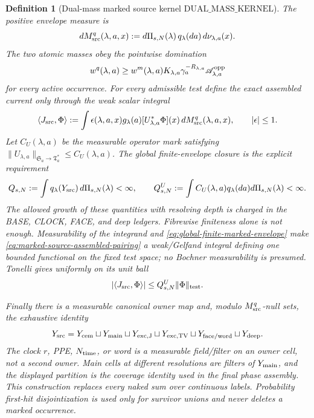 \documentclass[11pt]{article}
\newtheorem{definition}[theorem]{Definition}
\begin{document}
\begin{definition}[Dual-mass marked source kernel
$\mathrm{DUAL\_MASS\_KERNEL}$]
The positive envelope measure is
\begin{equation}
\label{eq:source-incidence-space}
 dM_{\rm src}^{q}(\lambda,a,x):=
 d\Pi_{s,N}(\lambda)\,q_\lambda(da)\,d\nu_{\lambda,a}(x).
\end{equation}
The two atomic masses obey the pointwise domination
\begin{equation}
\label{eq:source-incidence-envelope}
 w^q(\lambda,a)\ge w^m(\lambda,a)K_{\lambda,a}
 \gamma_a^{-R_{\lambda,a}}\mathscr A_{\lambda,a}^{\rm opp}
\end{equation}
for every active occurrence.  For every admissible test define
the exact assembled current only through the weak scalar integral
\begin{equation}
\label{eq:marked-source-assembled-pairing}
 \langle J_{\rm src},\Phi\rangle:=
 \int \epsilon(\lambda,a,x)
       g_\lambda(a)[U_{\lambda,a}^{*}\Phi](x)
       \,dM_{\rm src}^{q}(\lambda,a,x),
 \qquad |\epsilon|\le1.
\end{equation}
Let $C_U(\lambda,a)$ be the measurable operator mark satisfying
$\|U_{\lambda,a}\|_{\mathfrak S_a\to\mathfrak T_a^*}\le C_U(\lambda,a)$.
The global finite-envelope closure is the explicit requirement
\begin{equation}
\label{eq:global-finite-marked-envelope}
 Q_{s,N}:=\int q_\lambda(Y_{\rm src})\,d\Pi_{s,N}(\lambda)<\infty,
 \qquad
 Q_{s,N}^{U}:=\int C_U(\lambda,a)q_\lambda(da)
                  d\Pi_{s,N}(\lambda)<\infty.
\end{equation}
The allowed growth of these quantities with resolving depth is charged in
the BASE, CLOCK, FACE, and deep ledgers.  Fibrewise finiteness alone is not
enough.  Measurability of the integrand and
\eqref{eq:global-finite-marked-envelope} make
\eqref{eq:marked-source-assembled-pairing} a weak/Gelfand integral defining
one bounded functional on the fixed test space; no Bochner measurability is
presumed.  Tonelli gives uniformly on its unit ball
\begin{equation}
\label{eq:source-incidence-TV-bound}
 |\langle J_{\rm src},\Phi\rangle|
 \le Q_{s,N}^{U}\|\Phi\|_{\rm test}.
\end{equation}

Finally there is a measurable canonical owner map and, modulo
$M_{\rm src}^{q}$-null sets, the exhaustive identity
\begin{equation}
\label{eq:exhaustive-source-owner-partition}
 Y_{\rm src}=Y_{\rm cem}\sqcup Y_{\rm main}\sqcup
 Y_{\rm exc,J}\sqcup Y_{\rm exc,TV}\sqcup
 Y_{\rm face/word}\sqcup Y_{\rm deep}.
\end{equation}
The clock $r$, PPE, $N_{\rm time}$, or word is a measurable field/filter on
an owner cell, not a second owner.  Main cells at different resolutions are
filters of $Y_{\rm main}$, and the displayed partition is the coverage
identity used in the final phase assembly.  This construction replaces every
naked sum over continuous labels.  Probability first-hit disjointization is
used only for survivor unions and never deletes a marked occurrence.
\end{definition}
\end{document}
